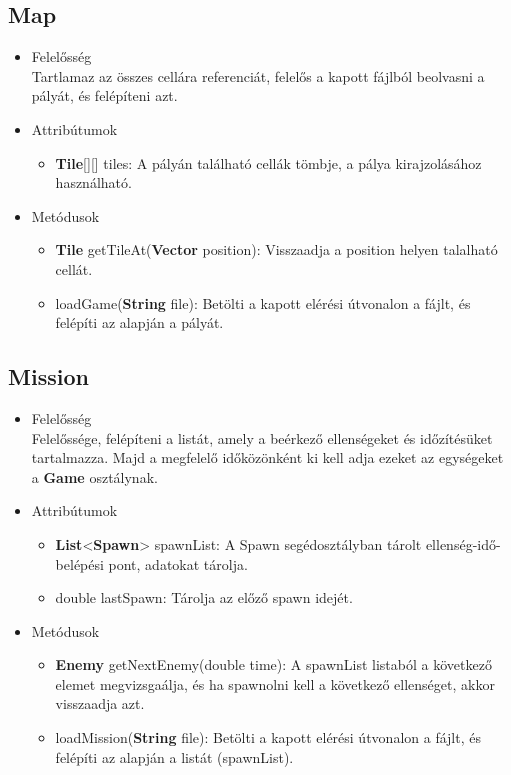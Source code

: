\subsection{Map}
\begin{itemize}
\item Felelősség\\
Tartlamaz az összes cellára referenciát, felelős a kapott fájlból beolvasni a pályát, és felépíteni azt.
\item Attribútumok
	\begin{itemize}
		\item \textbf{Tile}[][] tiles: A pályán található cellák tömbje, a pálya kirajzolásához használható.
	\end{itemize}
\item Metódusok
	\begin{itemize}
		\item \textbf{Tile} getTileAt(\textbf{Vector} position): Visszaadja a position helyen talalható cellát.
		\item loadGame(\textbf{String} file): Betölti a kapott elérési útvonalon a fájlt, és felépíti az alapján a pályát.
	\end{itemize}
\end{itemize}


\subsection{Mission}
\begin{itemize}
\item Felelősség\\
Felelőssége, felépíteni a listát, amely a beérkező ellenségeket és időzítésüket tartalmazza. Majd a megfelelő időközönként ki kell adja ezeket az egységeket a \textbf{Game} osztálynak.
\item Attribútumok
	\begin{itemize}
		\item \textbf{List}<\textbf{Spawn}> spawnList: A Spawn segédosztályban tárolt ellenség-idő-belépési pont, adatokat tárolja.
		\item double lastSpawn: Tárolja az előző spawn idejét.
	\end{itemize}
\item Metódusok
	\begin{itemize}
		\item \textbf{Enemy} getNextEnemy(double time): A spawnList listaból a következő elemet megvizsgaálja, és ha spawnolni kell a következő ellenséget, akkor visszaadja azt.
		\item loadMission(\textbf{String} file): Betölti a kapott elérési útvonalon a fájlt, és felépíti az alapján a listát (spawnList).
	\end{itemize}
\end{itemize}


